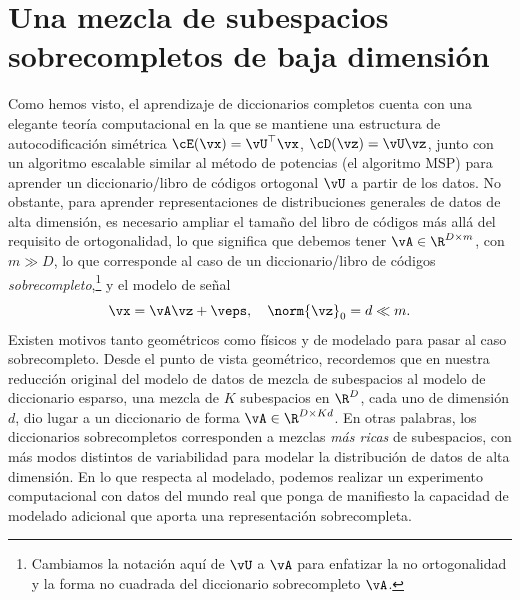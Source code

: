 \documentclass[../../book-main.tex]{subfiles}
\begin{document}
\section{Una mezcla de subespacios sobrecompletos de baja dimensión}
\label{sec:dictionary_learning}
Como hemos visto, el aprendizaje de diccionarios completos cuenta con una elegante
teoría computacional en la que se mantiene una estructura de autocodificación simétrica
$\cE(\vx) = \vU^\top \vx$, $\cD(\vz) = \vU \vz$, junto con un
algoritmo escalable similar al método de potencias (el algoritmo MSP) para aprender
un diccionario/libro de códigos ortogonal $\vU$ a partir de los datos. No obstante, para
aprender representaciones de distribuciones generales de datos de alta dimensión,
es necesario ampliar el tamaño del libro de códigos más allá del
requisito de ortogonalidad, lo que significa que debemos tener $\vA \in \R^{D
\times m}$, con $m \gg D$, lo que corresponde al caso de un
diccionario/libro de códigos \textit{sobrecompleto},\footnote{Cambiamos la
    notación aquí de $\vU$ a $\vA$ para enfatizar la
    no ortogonalidad y la forma no cuadrada del diccionario sobrecompleto
$\vA$.} y el modelo de señal
\begin{equation}\label{eq:model-DL-overcomplete}
    \vx =  \vA \vz + \veps,
    \quad
    \norm{\vz}_0 = d \ll m.
\end{equation}
Existen motivos tanto geométricos como físicos y de modelado para
pasar al caso sobrecompleto.
Desde el punto de vista geométrico, recordemos que en nuestra reducción original del modelo de datos de mezcla
de subespacios al modelo de diccionario esparso, una mezcla de
$K$ subespacios en $\R^D$, cada uno de dimensión $d$, dio lugar a un diccionario
de forma $\vA \in \R^{D \times Kd}$. 
En otras palabras, los diccionarios sobrecompletos corresponden a
mezclas \textit{más ricas} de subespacios, con más modos distintos de
variabilidad para modelar la distribución de datos de alta dimensión.
En lo que respecta al modelado, podemos realizar un experimento computacional con
datos del mundo real que ponga de manifiesto la capacidad de modelado adicional que aporta
una representación sobrecompleta.
\end{document}
